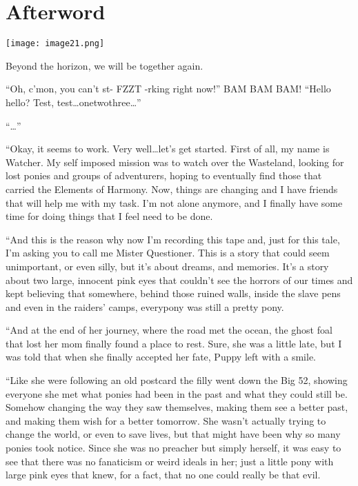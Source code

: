 \chapter{Afterword}

\texttt{[image: image21.png]}

\begin{intro}
    Beyond the horizon, we will be together again.
\end{intro}

{\rt

``Oh, c'mon, you can't st- FZZT -rking right now!'' BAM BAM BAM! ``Hello hello? Test, test\dots onetwothree\dots''

``\dots''

``Okay, it seems to work. Very well\dots let's get started. First of all, my name is Watcher. My self imposed mission was to watch over the Wasteland, looking for lost ponies and groups of adventurers, hoping to eventually find those that carried the Elements of Harmony. Now, things are changing and I have friends that will help me with my task. I'm not alone anymore, and I finally have some time for doing things that I feel need to be done.

``And this is the reason why now I'm recording this tape and, just for this tale, I'm asking you to call me Mister Questioner. This is a story that could seem unimportant, or even silly, but it's about dreams, and memories. It's a story about two large, innocent pink eyes that couldn't see the horrors of our times and kept believing that somewhere, behind those ruined walls, inside the slave pens and even in the raiders' camps, everypony was still a pretty pony.

``And at the end of her journey, where the road met the ocean, the ghost foal that lost her mom finally found a place to rest. Sure, she was a little late, but I was told that when she finally accepted her fate, Puppy left with a smile.

``Like she were following an old postcard the filly went down the Big 52, showing everyone she met what ponies had been in the past and what they could still be. Somehow changing the way they saw themselves, making them see a better past, and making them wish for a better tomorrow. She wasn't actually trying to change the world, or even to save lives, but that might have been why so many ponies took notice. Since she was no preacher but simply herself, it was easy to see that there was no fanaticism or weird ideals in her; just a little pony with large pink eyes that knew, for a fact, that no one could really be that evil.

}
